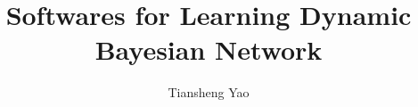 \documentclass{article}
\begin{document}
 \selectfont

\def\mytitle{Softwares for Learning Dynamic Bayesian Network}
\title{\mytitle}
\author{Tiansheng Yao}
\maketitle





\end{document}
